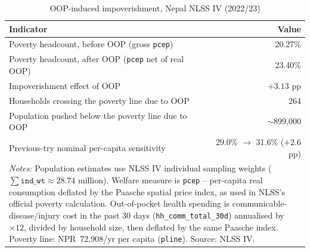 \begin{table}[htbp]
\centering
\caption{OOP-induced impoverishment, Nepal NLSS IV (2022/23)}
\label{tab:impoverishment}
\small
\begin{tabular}{lr}
\hline\hline
\textbf{Indicator} & \textbf{Value} \\
\hline
Poverty headcount, before OOP (gross \texttt{pcep})         & 20.27\% \\
Poverty headcount, after OOP (\texttt{pcep} net of real OOP) & 23.40\% \\
Impoverishment effect of OOP                                & $+3.13$ pp \\
\addlinespace
Households crossing the poverty line due to OOP             & 264 \\
Population pushed below the poverty line due to OOP         & $\sim$899{,}000 \\
\addlinespace
Previous-try nominal per-capita sensitivity                 & 29.0\% $\rightarrow$ 31.6\% ($+2.6$ pp) \\
\hline\hline
\multicolumn{2}{p{12cm}}{\footnotesize \textit{Notes:} Population estimates use NLSS IV individual sampling weights ($\sum \texttt{ind\_wt} \approx 28.74$ million). Welfare measure is \texttt{pcep} -- per-capita real consumption deflated by the Paasche spatial price index, as used in NLSS's official poverty calculation. Out-of-pocket health spending is communicable-disease/injury cost in the past 30 days (\texttt{hh\_comm\_total\_30d}) annualised by $\times 12$, divided by household size, then deflated by the same Paasche index. Poverty line: NPR~72{,}908/yr per capita (\texttt{pline}). Source: NLSS IV.} \\
\end{tabular}
\end{table}
